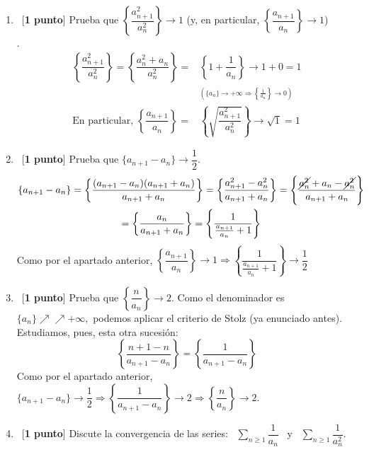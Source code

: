 \documentclass[12pt]{article}
\begin{document}
\begin{ejercicio}
\begin{enumerate}[label=\alph*)]
            \item\ [\textbf{1 punto}] Prueba que $\left\{\dfrac{a^2_{n+1}}{a^2_n}\right\} \xrightarrow{} 1$ (y, en particular, $\left\{\dfrac{a_{n+1}}{a_n}\right\} \xrightarrow{} 1$) \\.
            \begin{align*}
                 \left\{\dfrac{a_{n+1}^2}{a_n^2}\right\} = \left\{\dfrac{a_n^2 + a_n}{a_n^2}\right\}  = &\left\{ 1 + \dfrac{1}{a_n} \right\} 
                 \longrightarrow 1 + 0 = 1  \\
                & ^\left(\{a_n\} \rightarrow +\infty \Rightarrow \left\{\frac{1}{a_n}\right\} \rightarrow 0\right)\\
                 \text{En particular, } \left\{ \dfrac{a_{n+1}}{a_n}\right\}  = & \left\{\sqrt{ \dfrac{a_{n+1}^2}{a_n^2}}\right\} \rightarrow \sqrt{1} = 1
            \end{align*}
            \item\ [\textbf{1 punto}] Prueba que $\{a_{n+1} - a_n\} \rightarrow
            \dfrac{1}{2}$.
            \begin{gather*}
                \{a_{n+1} - a_n\} = \left\{\dfrac{(a_{n+1} - a_n)(a_{n+1} + a_n)}{a_{n+1} + a_n}\right\} = \left\{\dfrac{a_{n+1}^2 - a_n^2} {a_{n+1} + a_n}\right\} = \left\{\dfrac{\cancel{a_n^2} + a_n- \cancel{a_n^2}} {a_{n+1} + a_n}\right\} \\ = \left\{\frac{a_n}{a_{n+1} + a_n}\right\} = \left\{\frac{1}{\frac{a_{n+1}}{a_n} + 1}\right\}
            \end{gather*}
            Como  por el apartado anterior, $\left\{\dfrac{a_{n+1}}{a_n}\right\} \rightarrow 1 \Rightarrow\left\{\dfrac{1}{\frac{a_{n+1}}{a_n} + 1}\right\} \rightarrow \dfrac{1}{2}$
            \item\ [\textbf{1 punto}] Prueba que $\left\{\dfrac{n}{a_n}\right\} \xrightarrow{} 2$.
            Como el denominador es $\{a_n\} \nearrow \nearrow +\infty,$ podemos aplicar el criterio de Stolz (ya enunciado antes).
            Estudiamos, pues, esta otra sucesión:
            \begin{equation*}
                \left\{\dfrac{n + 1 - n}{a_{n+1} - a_n}\right\} = \left\{\dfrac{1}{a_{n+1} - a_n}\right\}
            \end{equation*}
            Como por el apartado anterior, $\{a_{n+1} - a_n\} \rightarrow \dfrac{1}{2} \Rightarrow \left\{\dfrac{1}{a_{n+1} - a_n}\right\} \rightarrow 2 \Rightarrow \left\{\dfrac{n}{a_n}\right\} \rightarrow 2.$
            \item\ [\textbf{1 punto}] Discute la convergencia de las series: \ $\displaystyle \sum\limits_{n\geq 1} \dfrac{1}{a_n}$ \ y \ $\displaystyle \sum\limits_{n\geq1} \dfrac{1}{a^2_n}$. \\

\end{enumerate}
\end{ejercicio}
\end{document}
